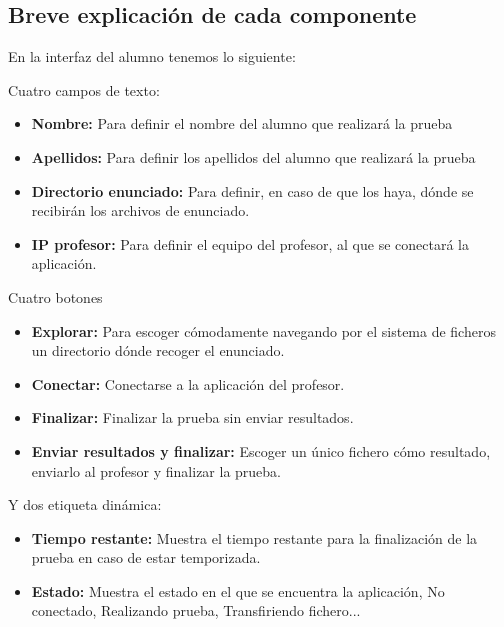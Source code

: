 \documentclass[11pt]{article}
\begin{document}
\subsection{Breve explicación de cada componente}

En la interfaz del alumno tenemos lo siguiente:

Cuatro campos de texto:

\begin{itemize}

    \item {\bfseries Nombre:} Para definir el nombre del alumno que realizará la prueba
    \item {\bfseries Apellidos:} Para definir los apellidos del alumno que realizará la prueba
    \item {\bfseries Directorio enunciado:} Para definir, en caso de que los haya, dónde se recibirán los archivos de enunciado.
    \item {\bfseries IP profesor:} Para definir el equipo del profesor, al que se conectará la aplicación.

\end{itemize}

Cuatro botones

\begin{itemize}

    \item {\bfseries Explorar:} Para escoger cómodamente navegando por el sistema de ficheros un directorio dónde recoger el enunciado.
    \item {\bfseries Conectar:} Conectarse a la aplicación del profesor.
    \item {\bfseries Finalizar:} Finalizar la prueba sin enviar resultados.
    \item {\bfseries Enviar resultados y finalizar:} Escoger un único fichero cómo resultado, enviarlo al profesor y finalizar la prueba.

\end{itemize}

Y dos etiqueta dinámica:

\begin{itemize}

    \item {\bfseries Tiempo restante:} Muestra el tiempo restante para la finalización de la prueba en caso de estar temporizada.

    \item {\bfseries Estado: } Muestra el estado en el que se encuentra la aplicación, No conectado, Realizando prueba, Transfiriendo fichero...

\end{itemize}
\end{document}
